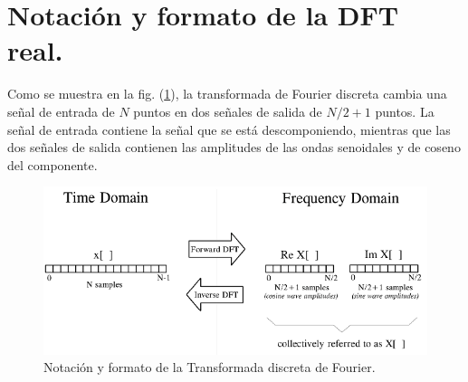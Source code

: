 \section{Notación y formato de la DFT real.}
Como se muestra en la fig. (\ref{fig:figura_TDF_05}), la transformada de Fourier discreta cambia una señal de entrada de $N$ puntos en dos señales de salida de $N / 2 +1$ puntos. La señal de entrada contiene la señal que se está descomponiendo, mientras que las dos señales de salida contienen las amplitudes de las ondas senoidales y de coseno del componente.
\begin{figure}[H]
    \centering
    \includegraphics[scale=0.7]{Imagenes/TDF_05.png}
    \caption{Notación y formato de la Transformada discreta de Fourier.}
    \label{fig:figura_TDF_05}
\end{figure}

